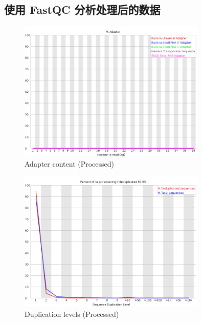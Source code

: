 \documentclass[UTF8]{ctexart}
\begin{document}
\subsection{使用 FastQC 分析处理后的数据}

\begin{figure}[!htb]
	\centering
	\includegraphics[width=0.8\textwidth]{img/SRR14325859_FastQC_Processed_img/adapter_content.png}	%
	\caption{Adapter content (Processed)\protect}    %
\end{figure}

\clearpage

\begin{figure}[!htb]
	\centering
	\includegraphics[width=0.8\textwidth]{img/SRR14325859_FastQC_Processed_img/duplication_levels.png}	%
	\caption{Duplication levels (Processed)\protect}    %
\end{figure}
\end{document}
